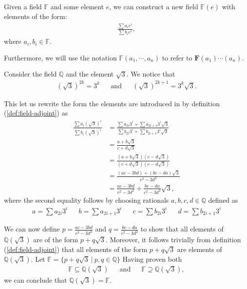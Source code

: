 \begin{defn} \label{def:field-adjoint}
  Given a field $\mathbb{F}$ and some element $e$, we can construct a new field $\mathbb{F}(e)$ with elements of the form:
\begin{align*}
  \frac{\sum a _i e ^i }{\sum b _i e ^i },
\end{align*}
where $a _i, b _i \in \mathbb{F}$.

  Furthermore, we will use the notation $\mathbb{F}(a _1 ,\cdots, a _n)$ to refer to $\textbf{F}(a _1) \cdots (a _n)$.
\end{defn}

\newpage
\begin{exmp} \label{exp:q-adjoint-sqrt-3}
  Consider the field $\mathbb Q$  and the element $\sqrt 3$. We notice that 
  \begin{align*}
    {(\sqrt 3)} ^{2k} = 3 ^k && \text{and} && {(\sqrt 3)} ^{2k + 1} = 3 ^k \sqrt 3.
  \end{align*}

  This let us rewrite the form the elements are introduced in by definition (\ref{def:field-adjoint}) as
  \begin{align*}
    \frac{\sum a _i {(\sqrt 3)} ^i }{\sum b _i {(\sqrt 3)} ^i }
    &= \frac{\sum a _{2i} 3 ^i + \sum a_{2i + 1} 3 ^i \sqrt 3}{\sum b _{2i} 3 ^i + \sum b_{2i + 1} 3 ^i \sqrt 3} 
    \\&= \frac{a + b\sqrt 3}{c + d\sqrt 3}
    \\&= \frac{(a + b \sqrt 3)(c - d \sqrt 3)}{(c + d \sqrt 3)(c - d \sqrt 3)}
    \\&= \frac{(ac - 3bd) + (bc - da) \sqrt 3}{c ^2 - 3 d ^2 }
    \\&= \frac{ac - 3bd}{c ^2 - 3 d ^2 } + \frac{bc - da}{c ^2 - 3 d ^2 } \sqrt 3,
  \end{align*}
  where the second equality follows by choosing rationals $a, b, c, d \in \mathbb{Q}$ defined as
  \begin{align*}
    a = \sum a _{2i} 3 ^i && b = \sum a _{2i + 1} 3 ^i  &&
    c = \sum b _{2i} 3 ^i && d = \sum b _{2i + 1} 3 ^i 
  \end{align*}

  We can now define $p = \frac{ac - 3bd}{c ^2 - 3 d ^2 }$ and $q = \frac{bc - da}{c ^2 - 3 d ^2 }$ to show that all elements of $ \mathbb{Q} (\sqrt{3})$ are of the form $p + q \sqrt 3$. Moreover, it follows trivially from  definition (\ref{def:field-adjoint}) that all elements of the form $p + q \sqrt 3$ are elements of $\mathbb{Q} (\sqrt{3})$. Let $\mathbb{F} = \{p + q \sqrt 3 \:|\: p, q \in \mathbb{Q} \}$ Having proven both 
  \begin{align*}
     \mathbb{F} \subseteq \mathbb{Q} (\sqrt 3) && \text{and} && \mathbb{F} \supseteq \mathbb{Q} (\sqrt 3),
  \end{align*}
 we can conclude that $\mathbb{Q} (\sqrt{3})  = \mathbb{F}$.


\end{exmp}
